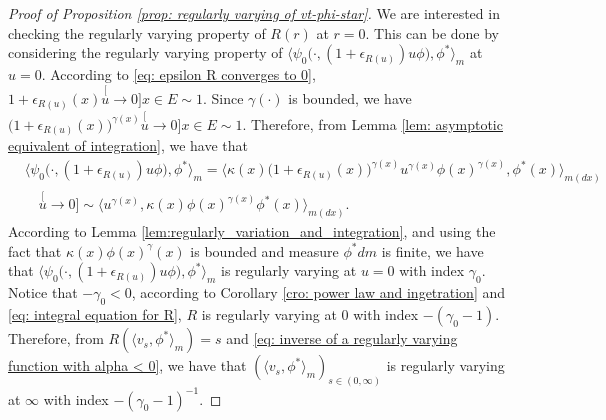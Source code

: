 \documentclass[12pt, a4paper]{amsart}
\theoremstyle{definition}
\numberwithin{equation}{section}
\begin{document}
\begin{proof}[Proof of Proposition \ref{prop: regularly varying of vt-phi-star}]
	We are interested in checking the regularly varying property of $R(r)$ at $r=0$.
	This can be done by considering the regularly varying property of $\big\langle \psi_0 \big(\cdot ,( 1 + \epsilon_{R(u)} ) u \phi \big), \phi^* \big\rangle_m$ at
	$u = 0$.
    According to \eqref{eq: epsilon R converges to 0},  $1+ \epsilon_{R(u)}(x) \stackrel[u\to 0]{x\in E}{\sim} 1$.
    Since $\gamma(\cdot)$ is bounded, we have $\big(1+ \epsilon_{R(u)}(x)\big)^{\gamma(x)}\stackrel[u\to 0]{x\in E}{\sim} 1$.
	Therefore, from Lemma \ref{lem: asymptotic equivalent of integration}, we have that
\[\label{eq: regularly part in the integration}\begin{split}
	&\big\langle \psi_0 \big(\cdot,( 1 + \epsilon_{R(u)} ) u \phi \big), \phi^* \big\rangle_m
	= \big\langle \kappa (x)\big( 1 + \epsilon_{R(u)}(x)\big )^{\gamma(x)} u^{\gamma(x)} \phi(x)^{\gamma(x)} , \phi^*(x) \big\rangle_{m(dx)}
	\\ &\quad \stackrel[u\to 0]{}{\sim}  \langle u^{\gamma(x)} , \kappa (x)\phi(x)^{\gamma(x)} \phi^*(x) \rangle_{m(dx)}.
\end{split}\]
	According to Lemma \ref{lem:regularly_variation_and_integration},
 and using the fact that
$\kappa(x)\phi(x)^\gamma(x)$ is bounded and measure $\phi^* dm$ is finite, we have that $\langle \psi_0\big(\cdot,(1+\epsilon_{R(u)})u\phi \big), \phi^* \rangle_m$ is regularly varying at $u = 0$ with index $\gamma_0$.
	Notice that $-\gamma_0 < 0$, according to Corollary \ref{cro: power law and ingetration} and \eqref{eq: integral equation for R}, $R$ is regularly varying at $0$ with index $-(\gamma_0 - 1)$.
	Therefore, from $R(\langle v_s, \phi^*\rangle_m) = s$ and \eqref{eq: inverse of a regularly varying function with alpha < 0}, we have that $(\langle v_s, \phi^*\rangle_m)_{s\in (0,\infty)}$ is regularly varying at $\infty$ with index $-(\gamma_0 - 1)^{-1}$.
	

\end{proof}
\end{document}
